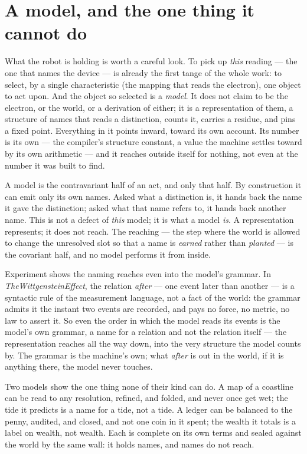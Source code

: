 \section{A model, and the one thing it cannot do}

What the robot is holding is worth a careful look.
To pick up \emph{this} reading --- the one that names the device --- is already the first tange of the whole work: to
select, by a single characteristic (the mapping that reads the electron), one object to act upon.
And the object so selected is a \emph{model}.
It does not claim to be the electron, or the world, or a derivation of either; it is a representation of them, a structure
of names that reads a distinction, counts it, carries a residue, and pins a fixed point.
Everything in it points inward, toward its own account.
Its number is its own --- the compiler's structure constant, a value the machine settles toward by its own arithmetic ---
and it reaches outside itself for nothing, not even at the number it was built to find.

A model is the contravariant half of an act, and only that half.
By construction it can emit only its own names.
Asked what a distinction is, it hands back the name it gave the distinction; asked what that name refers to, it hands back
another name.
This is not a defect of \emph{this} model; it is what a model \emph{is}.
A representation represents; it does not reach.
The reaching --- the step where the world is allowed to change the unresolved slot so that a name is \emph{earned} rather
than \emph{planted} --- is the covariant half, and no model performs it from inside.

Experiment shows the naming reaches even into the model's grammar.
In \emph{TheWittgensteinEffect}, the relation \emph{after} --- one event later than another --- is a syntactic rule of
the measurement language, not a fact of the world: the grammar admits it the instant two events are recorded, and pays no
force, no metric, no law to assert it.
So even the order in which the model reads its events is the model's own grammar, a name for a relation and not the
relation itself --- the representation reaches all the way down, into the very structure the model counts by.
The grammar is the machine's own; what \emph{after} is out in the world, if it is anything there, the model never touches.

Two models show the one thing none of their kind can do.
A map of a coastline can be read to any resolution, refined, and folded, and never once get wet; the tide it predicts is
a name for a tide, not a tide.
A ledger can be balanced to the penny, audited, and closed, and not one coin in it spent; the wealth it totals is a label
on wealth, not wealth.
Each is complete on its own terms and sealed against the world by the same wall: it holds names, and names do not reach.

